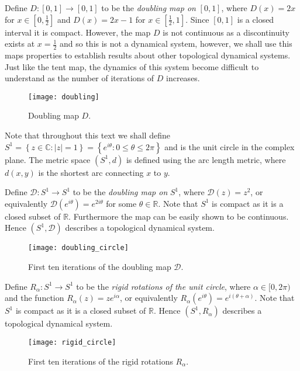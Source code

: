 \begin{exmp} \label{exmp:doubling-map}
    Define $D: [0,1] \to [0,1]$ to be the \emph{doubling map on} $[0, 1]$, where $D(x) = 2x$ for $x \in \left[0, \frac{1}{2}\right]$ and $D(x) = 2x - 1$ for $x \in \left[\frac{1}{2}, 1\right]$. Since $[0, 1]$ is a closed interval it is compact. However, the map $D$ is not continuous as a discontinuity exists at $x = \frac{1}{2}$ and so this is not a dynamical system, however, we shall use this maps properties to establish results about other topological dynamical systems. Just like the tent map, the dynamics of this system become difficult to understand as the number of iterations of $D$ increases.

    \begin{figure}[h]
        \centering
        \texttt{[image: doubling]}
        \caption{Doubling map $D$.}
        \label{fig:doubling}
    \end{figure}
\end{exmp}

Note that throughout this text we shall define $S^1 = \left\lbrace z \in \mathbb{C}: |z| = 1 \right\rbrace = \left\lbrace e^{i\theta} : 0 \leq \theta \leq 2\pi \right\rbrace$ and is the unit circle in the complex plane. The metric space $(S^1, d)$ is defined using the arc length metric, where $d(x, y)$ is the shortest arc connecting $x$ to $y$. 

\begin{exmp} \label{exmp:doubling-map-s1}
    Define $\mathcal{D}: S^1 \to S^1$ to be the \emph{doubling map on} $S^1$, where $\mathcal{D}(z) = z^2$, or equivalently $\mathcal{D}(e^{i\theta}) = e^{2i\theta}$ for some $\theta \in \mathbb{R}$. Note that $S^1$ is compact as it is a closed subset of $\mathbb{R}$. Furthermore the map can be easily shown to be continuous. Hence $(S^1, \mathcal{D})$ describes a topological dynamical system.

    \begin{figure}[h]
        \centering
        \texttt{[image: doubling\_circle]}
        \caption{First ten iterations of the doubling map $\mathcal{D}$.}
        \label{fig:doubling-circle}
    \end{figure}
\end{exmp}

\begin{exmp} \label{exmp:rigid-rotations}
    Define $R_\alpha: S^1 \to S^1$ to be the \emph{rigid rotations of the unit circle}, where $\alpha \in [0, 2\pi)$ and the function $R_{\alpha}(z) = ze^{i\alpha}$, or equivalently $R_\alpha(e^{i\theta}) = e^{i(\theta + \alpha)}$. Note that $S^1$ is compact as it is a closed subset of $\mathbb{R}$. Hence $(S^1, R_{\alpha})$ describes a topological dynamical system.

    \begin{figure}[h]
        \centering
        \texttt{[image: rigid\_circle]}
        \caption{First ten iterations of the rigid rotations $R_\alpha$.}
        \label{fig:rigid-circle}
    \end{figure}
\end{exmp}

